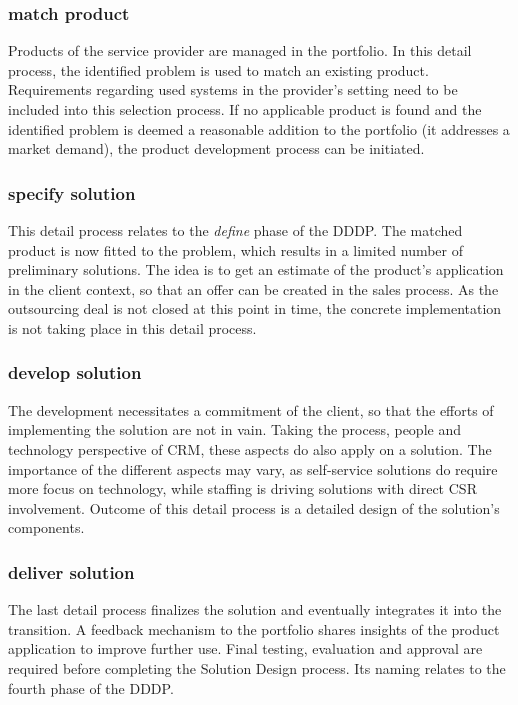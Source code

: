 	\subsubsection{match product}
	Products of the service provider are managed in the portfolio. In this detail process, the identified problem is used to match an existing product. Requirements regarding used systems in the provider's setting need to be included into this selection process. If no applicable product is found and the identified problem is deemed a reasonable addition to the portfolio (\ie it addresses a market demand), the product development process can be initiated. 
	
 	\subsubsection{specify solution}
 	This detail process relates to the \textit{define} phase of the \acrshort{DDDP}. The matched product is now fitted to the problem, which results in a limited number of preliminary solutions. The idea is to get an estimate of the product's application in the client context, so that an offer can be created in the sales process. As the outsourcing deal is not closed at this point in time, the concrete implementation is not taking place in this detail process. 
 	
	\subsubsection{develop solution}
	The development necessitates a commitment of the client, so that the efforts of implementing the solution are not in vain. Taking the process, people and technology perspective of \acrshort{CRM}, these aspects do also apply on a solution. The importance of the different aspects may vary, as self-service solutions do require more focus on technology, while staffing is driving solutions with direct \acrshort{CSR} involvement. Outcome of this detail process is a detailed design of the solution's components. 
	
 	\subsubsection{deliver solution}
	 
	 The last detail process finalizes the solution and eventually integrates it into the transition. A feedback mechanism to the portfolio shares insights of the product application to improve further use. Final testing, evaluation and approval are required before completing the Solution Design process. Its naming relates to the fourth phase of the \acrshort{DDDP}.
	
